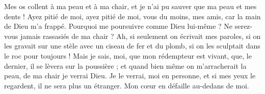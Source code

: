 \lettrine{M}{}es os collent à ma peau et à ma chair, et je n’ai pu sauver que ma peau et mes dents !
Ayez pitié de moi, ayez pitié de moi, vous du moins, mes amis, car la main de Dieu m’a frappé.
Pourquoi me poursuivre comme Dieu lui-même ? Ne serez-vous jamais rassasiés de ma chair ?
Ah, si seulement on écrivait mes paroles, si on les gravait sur une stèle
avec un ciseau de fer et du plomb, si on les sculptait dans le roc pour toujours !
Mais je sais, moi, que mon rédempteur est vivant, que, le dernier, il se lèvera sur la poussière ;
et quand bien même on m’arracherait la peau, de ma chair je verrai Dieu.
Je le verrai, moi en personne, et si mes yeux le regardent, il ne sera plus un étranger. Mon cœur en défaille au-dedans de moi.
